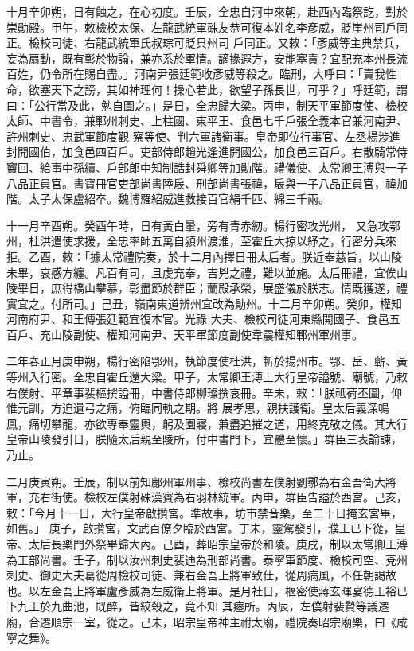 \begin{pinyinscope}
 十月辛卯朔，日有蝕之，在心初度。壬辰，全忠自河中來朝，赴西內臨祭訖，對於崇勛殿。甲午，敕檢校太保、左龍武統軍硃友恭可復本姓名李彥威，貶崖州司戶同正。檢校司徒、右龍武統軍氏叔琮可貶貝州司
 戶同正。又敕：「彥威等主典禁兵，妄為扇動，既有彰於物論，兼亦系於軍情。謫掾遐方，安能塞責？宜配充本州長流百姓，仍令所在賜自盡。」河南尹張廷範收彥威等殺之。臨刑，大呼曰：「賣我性命，欲塞天下之謗，其如神理何！操心若此，欲望子孫長世，可乎？」呼廷範，謂曰：「公行當及此，勉自圖之。」是日，全忠歸大梁。丙申，制天平軍節度使、檢校太師、中書令，兼鄆州刺史、上柱國、東平王、食邑七千戶張全義本官兼河南尹、許州刺史、忠武軍節度觀
 察等使、判六軍諸衛事。皇帝即位行事官、左丞楊涉進封開國伯，加食邑四百戶。吏部侍郎趙光逢進開國公，加食邑三百戶。右散騎常侍竇回、給事中孫續、戶部郎中知制誥封舜卿等加勛階。禮儀使、太常卿王溥與一子八品正員官。書寶冊官吏部尚書陸扆、刑部尚書張禕，扆與一子八品正員官，禕加階。太子太保盧紹卒。魏博羅紹威進救接百官絹千匹、綿三千兩。



 十一月辛酉朔。癸酉午時，日有黃白暈，旁有青赤紉。楊行密攻光州，
 又急攻鄂州，杜洪遣使求援，全忠率師五萬自潁州渡淮，至霍丘大掠以紓之，行密分兵來拒。乙酉，敕：「據太常禮院奏，於十二月內擇日冊太后者。朕近奉慈旨，以山陵未畢，哀感方纏。凡百有司，且虔充奉，吉兇之禮，難以並施。太后冊禮，宜俟山陵畢日，庶得橋山攀慕，彰盡節於群臣；蘭殿承榮，展盛儀於朕志。情既獲遂，禮實宜之。付所司。」己丑，嶺南東道辨州宜改為勛州。十二月辛卯朔。癸卯，權知河南府尹、和王傅張廷範宜復本官。光祿
 大夫、檢校司徒河東縣開國子、食邑五百戶、充山陵副使、權知河南尹、天平軍節度副使韋震權知鄆州軍州事。



 二年春正月庚申朔，楊行密陷鄂州，執節度使杜洪，斬於揚州市。鄂、岳、蘄、黃等州入行密。全忠自霍丘還大梁。甲子，太常卿王溥上大行皇帝謚號、廟號，乃敕右僕射、平章事裴樞撰謚冊，中書侍郎柳璨撰哀冊。辛未，敕：「朕祗荷丕圖，仰惟元訓，方迫遺弓之痛，俯臨同軌之期。將
 展孝思，親扶護衛。皇太后義深鳴鳳，痛切攀龍，亦欲專奉靈輿，躬及園寢，兼盡追摧之道，用終克敬之儀。其大行皇帝山陵發引日，朕隨太后親至陵所，付中書門下，宜體至懷。」群臣三表論諫，乃止。



 二月庚寅朔。壬辰，制以前知鄜州軍州事、檢校尚書左僕射劉鄩為右金吾衛大將軍，充右街使。檢校左僕射硃漢賓為右羽林統軍。丙申，群臣告謚於西宮。己亥，敕：「今月十一日，大行皇帝啟攢宮。準故事，坊市禁音樂，至二十日掩玄宮畢，如舊。」
 庚子，啟攢宮，文武百僚夕臨於西宮。丁未，靈駕發引，濮王已下從，皇帝、太后長樂門外祭畢歸大內。己酉，葬昭宗皇帝於和陵。庚戌，制以太常卿王溥為工部尚書。壬子，制以汝州刺史裴迪為刑部尚書。泰寧軍節度、檢校司空、兗州刺史、御史大夫葛從周檢校司徒、兼右金吾上將軍致仕，從周病風，不任朝謁故也。以左金吾上將軍盧彥威為左威衛上將軍。是月社日，樞密使蔣玄暉宴德王裕已下九王於九曲池，既醉，皆絞殺之，竟不知
 其瘞所。丙辰，左僕射裴贄等議遷廟，合遷順宗一室，從之。己未，昭宗皇帝神主祔太廟，禮院奏昭宗廟樂，曰《咸寧之舞》。




\end{pinyinscope}
